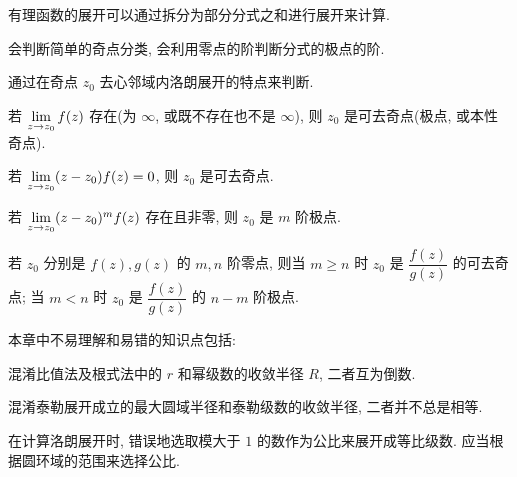 \begin{conclusion}
\begin{conclusion}
    \item 有理函数的展开可以通过拆分为部分分式之和进行展开来计算.
  \end{conclusion}
  \item 会判断简单的奇点分类, 会利用零点的阶判断分式的极点的阶.
  \begin{conclusion}
    \item 通过在奇点 $z_0$ 去心邻域内洛朗展开的特点来判断.
    \item 若 $\lim\limits_{z\rightarrow z_0} f(z)$ 存在(为 $\infty$, 或既不存在也不是 $\infty$), 则 $z_0$ 是可去奇点(极点, 或本性奇点).
    \item 若 $\lim\limits_{z\rightarrow z_0} (z-z_0)f(z)=0$, 则 $z_0$ 是可去奇点.
    \item 若 $\lim\limits_{z\rightarrow z_0} (z-z_0)^mf(z)$ 存在且非零, 则 $z_0$ 是 $m$ 阶极点.
    \item 若 $z_0$ 分别是 $f(z),g(z)$ 的 $m,n$ 阶零点, 则当 $m\ge n$ 时 $z_0$ 是 $\dfrac{f(z)}{g(z)}$ 的可去奇点; 当 $m<n$ 时 $z_0$ 是 $\dfrac{f(z)}{g(z)}$ 的 $n-m$ 阶极点.
  \end{conclusion}
\end{conclusion}

本章中不易理解和易错的知识点包括:
\begin{enuma}
  \item 混淆比值法及根式法中的 $r$ 和幂级数的收敛半径 $R$, 二者互为倒数.
  \item 混淆泰勒展开成立的最大圆域半径和泰勒级数的收敛半径, 二者并不总是相等.
  \item 在计算洛朗展开时, 错误地选取模大于 $1$ 的数作为公比来展开成等比级数. 应当根据圆环域的范围来选择公比.
\end{enuma}




